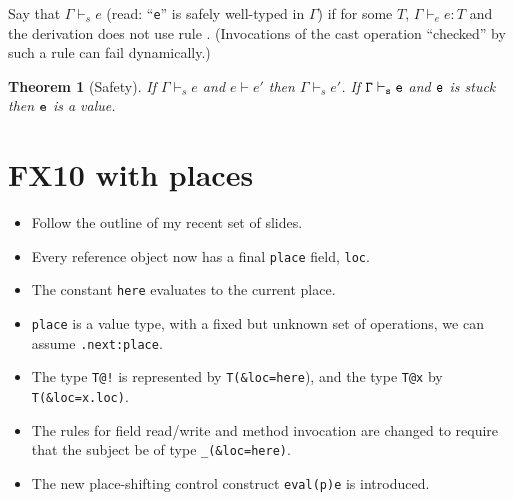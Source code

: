 \documentclass[nocopyrightspace,preprint,10pt]{sigplanconf}
\newtheorem{theorem}{Theorem}[section]
\newcommand\FXten{{\sf FX10}}
\begin{document}
Say that $\Gamma \vdash_s e$ (read: ``{\tt e}'' is safely well-typed in $\Gamma$) if
for some $T$, $\Gamma \vdash_e e:T$ and the derivation does not use rule
. (Invocations of the cast operation ``checked'' by such a rule can fail
dynamically.) 

\begin{theorem}[Safety] If $\Gamma \vdash_s  e$ and $e \vdash e'$ then
$\Gamma \vdash_s e'$. If $\tt \Gamma \vdash_s e$ and $\tt e$ is stuck then $\tt e$ is a value.
\end{theorem}

\section{\FXten{} with places}

{\em
  \begin{itemize}
    \item Follow the outline of my recent set of slides.
    \item Every reference object now has a final {\tt place} field, {\tt loc}.
    \item The constant {\tt here} evaluates to the current place.
    \item {\tt place} is a value type, with a fixed but unknown set of
      operations, we can assume {\tt .next:place}.
    \item The type {\tt T@!} is represented by {\tt T(\&loc=here}), and
      the type {\tt T@x} by {\tt T(\&loc=x.loc)}.
    \item The rules for field read/write and method invocation are changed to require that
      the subject be of type {\tt \_(\&loc=here)}.
    \item The new place-shifting control construct {\tt eval(p)e} is introduced.
  \end{itemize}
}


\end{document}
